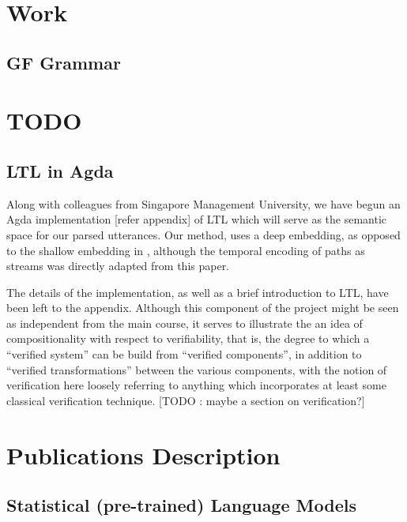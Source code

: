 \documentclass[a4paper, 11pt]{article}
\begin{document}
\section{Work} 

\subsection{GF Grammar}

\section{TODO} 

\subsection{LTL in Agda}

Along with colleagues from Singapore Management University, we have begun an
Agda implementation \cite{wltl} [refer appendix] of LTL which will serve as the semantic space
for our parsed utterances. Our method, uses a deep embedding, as opposed to the
shallow embedding in \cite{coqLTL}, although the temporal encoding of paths as
streams was directly adapted from this paper.

The details of the implementation, as well as a brief introduction to LTL, have
been left to the appendix. Although this component of the project might be seen
as independent from the main course, it serves to illustrate the
an idea of compositionality with respect to verifiability, that is, the degree
to which a ``verified system'' can be build from ``verified components'', in
addition to ``verified transformations'' between the various components, with
the notion of verification here loosely referring to anything which incorporates
at least some classical verification technique. [TODO : maybe a section on verification?]

\section{Publications Description}

\subsection{Statistical (pre-trained) Language Models}
\end{document}
